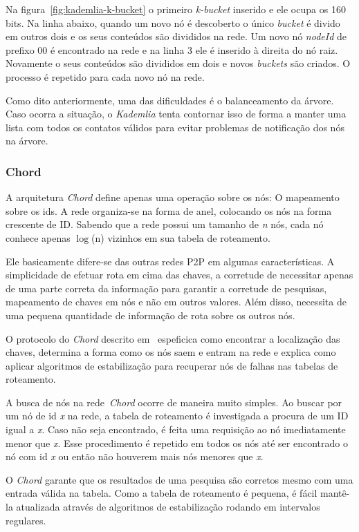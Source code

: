 Na figura~\ref{fig:kademlia-k-bucket} o primeiro \emph{k-bucket} inserido e ele ocupa os 160 bits. Na linha abaixo, quando um novo nó é descoberto o único \emph{bucket} é divido em outros dois e os seus conteúdos são divididos na rede. Um novo nó \emph{nodeId} de prefixo 00 é encontrado na rede e na linha 3 ele é inserido à direita do nó raiz. Novamente o seus conteúdos são divididos em dois e novos \emph{buckets} são criados. O processo é repetido para cada novo nó na rede.

Como dito anteriormente, uma das dificuldades é o balanceamento da árvore. Caso ocorra a situação, o \emph{Kademlia} tenta contornar isso de forma a manter uma lista com todos os contatos válidos para evitar problemas de notificação dos nós na árvore.

\subsubsection{Chord}

A arquitetura \emph{Chord} define apenas uma operação sobre os nós: O mapeamento sobre os ids. A rede organiza-se na forma de anel, colocando os nós na forma crescente de ID. Sabendo que a rede possui um tamanho de \emph{n} nós, cada nó conhece apenas $\log$(n) vizinhos em sua tabela de roteamento.

Ele basicamente difere-se das outras redes P2P em algumas características. A simplicidade de efetuar rota em cima das chaves, a corretude de necessitar apenas de uma parte correta da informação para garantir a corretude de pesquisas, mapeamento de chaves em nós e não em outros valores. Além disso, necessita de uma pequena quantidade de informação de rota sobre os outros nós.

O protocolo do \emph{Chord} descrito em~\cite{stoica01} espeficica como encontrar a localização das chaves, determina a forma como os nós saem e entram na rede e explica como aplicar algoritmos de estabilização para recuperar nós de falhas nas tabelas de roteamento.

A busca de nós na rede~\emph{Chord} ocorre de maneira muito simples. Ao buscar por um nó de id \emph{x} na rede, a tabela de roteamento é investigada a procura de um ID igual a \emph{x}. Caso não seja encontrado, é feita uma requisição ao nó imediatamente menor que \emph{x}. Esse procedimento é repetido em todos os nós até ser encontrado o nó com id \emph{x} ou então não houverem mais nós menores que \emph{x}.

O \emph{Chord} garante que os resultados de uma pesquisa são corretos mesmo com uma entrada válida na tabela. Como a tabela de roteamento é pequena, é fácil mantê-la atualizada através de algoritmos de estabilização rodando em intervalos regulares.

